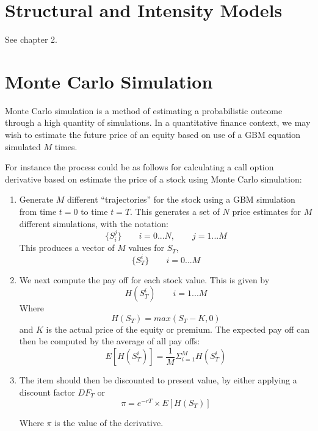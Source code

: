 \section{Structural and Intensity Models}
\TODO See \cite{advancedquantcpp} chapter 2.

\section{Monte Carlo Simulation}
Monte Carlo simulation is a method of estimating a probabilistic outcome through a high quantity of simulations. In a quantitative finance context, we may wish to estimate the future price of an equity based on use of a GBM equation simulated $M$ times. 

For instance the process could be as follows for calculating a call option derivative based on estimate the price of a stock using Monte Carlo simulation:

\begin{enumerate}
	\item Generate $M$ different ``trajectories'' for the stock using a GBM simulation from time $t=0$ to time $t=T$. This generates a set of $N$ price estimates for $M$ different simulations, with the notation:
	\begin{equation}
		\{S_i^j\}\qquad i = 0...N,\qquad j=1...M
	\end{equation}
	This produces a vector of $M$ values for $S_T$, 
	\begin{equation}
		\{S_T^i\}\qquad i = 0...M
	\end{equation}
	
	\item We next compute the pay off for each stock value. This is given by 
	\begin{equation}
		H(S_T^i)\qquad i=1...M
	\end{equation}
	Where 
	\begin{equation}
		H(S_T)=max(S_T-K,0)
	\end{equation}
	and $K$ is the actual price of the equity or premium. The expected pay off can then be computed by the average of all pay offs:
	\begin{equation}
		E[H(S_T^i)]=\frac{1}{M}\Sigma_{i=1}^{M}H(S_T^i)
	\end{equation}
	
	\item The item should then be discounted to present value, by either applying a discount factor $DF_T$ or 
	\begin{equation}
		\pi = e^{-rT}\times E[H(S_T)]
	\end{equation}
	
	Where $\pi$ is the value of the derivative.
\end{enumerate}




